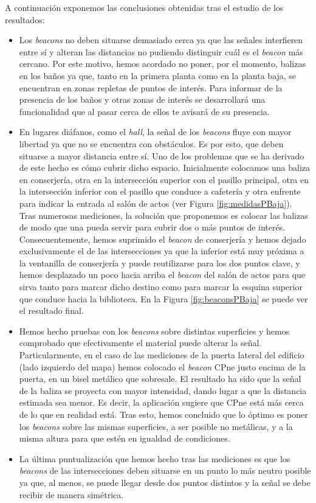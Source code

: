 A continuación exponemos las conclusiones obtenidas tras el estudio de los resultados:
\begin{itemize}
	\item Los \textit{beacons} no deben situarse demasiado cerca ya que las señales interfieren entre sí y alteran las distancias no pudiendo distinguir cuál es el \textit{beacon} más cercano. Por este motivo, hemos acordado no poner, por el momento, balizas en los baños ya que, tanto en la primera planta como en la planta baja, se encuentran en zonas repletas de puntos de interés. Para informar de la presencia de los baños y otras zonas de interés se desarrollará una funcionalidad que al pasar cerca de ellos te avisará de su presencia.
	
	\item En lugares diáfanos, como el \textit{hall}, la señal de los \textit{beacons} fluye con mayor libertad ya que no se encuentra con obstáculos. Es por esto, que deben situarse a mayor distancia entre sí. Uno de los problemas que se ha derivado de este hecho es cómo cubrir dicho espacio. Inicialmente colocamos una baliza en conserjería, otra en la intersección superior con el pasillo principal, otra en la intersección inferior con el pasillo que conduce a cafetería y otra enfrente para indicar la entrada al salón de actos (ver Figura \ref{fig:medidasPBaja}). Tras numerosas mediciones, la solución que proponemos es colocar las balizas de modo que una pueda servir para cubrir dos o más puntos de interés. Consecuentemente, hemos suprimido el \textit{beacon} de conserjería y hemos dejado exclusivamente el de las intersecciones ya que la inferior está muy próxima a la ventanilla de conserjería y puede reutilizarse para los dos puntos clave, y hemos desplazado un poco hacia arriba el \textit{beacon} del salón de actos para que sirva tanto para marcar dicho destino como para marcar la esquina superior que conduce hacia la biblioteca. En la Figura \ref{fig:beaconsPBaja} se puede ver el resultado final.
	
	\item Hemos hecho pruebas con los \textit{beacons} sobre distintas superficies y hemos comprobado que efectivamente el material puede alterar la señal. Particularmente, en el caso de las mediciones de la puerta lateral del edificio (lado izquierdo del mapa) hemos colocado el \textit{beacon} CPne justo encima de la puerta, en un bisel metálico que sobresale. El resultado ha sido que la señal de la baliza se proyecta con mayor intensidad, dando lugar a que la distancia estimada sea menor. Es decir, la aplicación sugiere que CPne está más cerca de lo que en realidad está. Tras esto, hemos concluido que lo óptimo es poner los \textit{beacons} sobre las mismas superficies, a ser posible no metálicas, y a la misma altura para que estén en igualdad de condiciones. 
	
	\item La última puntualización que hemos hecho tras las mediciones es que los \textit{beacons} de las intersecciones deben situarse en un punto lo más neutro posible ya que, al menos, se puede llegar desde dos puntos distintos y la señal se debe recibir de manera simétrica. 
\end{itemize}

